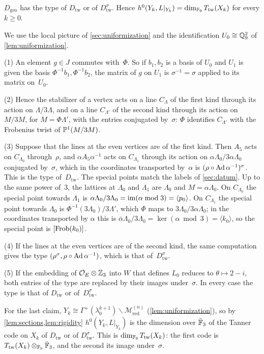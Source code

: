 \begin{lemma}\label{lem:twist}
\notformalized
$D_{\mathrm{geo}}$ has the type of $D_{\mathrm{tw}}$ or of $D_{\mathrm{tw}}^\sigma$. Hence
$h^0(Y_k,L|_{Y_k})=\dim_{\mathbb{F}_9}T_{\mathrm{tw}}(X_k)$ for every $k\ge0$.
\end{lemma}
\begin{informalproof}
We use the local picture of \cref{sec:uniformization} and the identification $U_0\cong\mathbb{Q}_9^2$ of
\cref{lem:uniformization}.

(1) An element $g\in J$ commutes with~$\Phi$. So if $b_1,b_2$ is a basis of $U_0$ and $U_1$ is given the basis
$\Phi^{-1}b_1,\Phi^{-1}b_2$, the matrix of $g$ on $U_1$ is $\sigma^{-1}=\sigma$ applied to its matrix on~$U_0$.

(2) Hence the stabilizer of a vertex acts on a line $C_\Lambda$ of the first kind through its action on $\Lambda/3\Lambda$,
and on a line $C_{\Lambda'}$ of the second kind through its action on $M/3M$, for $M=\Phi\Lambda'$, with the entries
conjugated by~$\sigma$: $\Phi$ identifies $C_{\Lambda'}$ with the Frobenius twist of $\mathbb{P}^1(M/3M)$.

(3) Suppose that the lines at the even vertices are of the first kind. Then $A_5$ acts on $C_{\Lambda_0}$ through~$\rho$, and
$\alpha A_5\alpha^{-1}$ acts on $C_{\Lambda_1}$ through its action on $\alpha\Lambda_0/3\alpha\Lambda_0$ conjugated by~$\sigma$,
which in the coordinates transported by~$\alpha$ is $(\rho\circ\operatorname{Ad}\alpha^{-1})^\sigma$. This is the type of~$D_{\mathrm{tw}}$.
The special points match the labels of \cref{sec:datum}. Up to the same power of~$3$, the lattices at $\Lambda_0$ and
$\Lambda_1$ are $\Lambda_0$ and $M=\alpha\Lambda_0$. On $C_{\Lambda_0}$ the special point towards $\Lambda_1$ is
$\alpha\Lambda_0/3\Lambda_0=\operatorname{im}(\alpha\bmod3)=\langle p_0\rangle$. On $C_{\Lambda_1}$ the special point towards $\Lambda_0$ is
$\Phi^{-1}(3\Lambda_0)/3\Lambda'$, which $\Phi$ maps to $3\Lambda_0/3\alpha\Lambda_0$; in the coordinates transported by
$\alpha$ this is $\bar\alpha\Lambda_0/3\Lambda_0=\ker(\alpha\bmod3)=\langle k_0\rangle$, so the special point is
$[\operatorname{Frob}(k_0)]$.

(4) If the lines at the even vertices are of the second kind, the same computation gives the type
$(\rho^\sigma,\rho\circ\operatorname{Ad}\alpha^{-1})$, which is that of~$D_{\mathrm{tw}}^\sigma$.

(5) If the embedding of $\mathcal{O}_E\otimes\mathbb{Z}_3$ into $W$ that defines $L_0$ reduces to $\theta\mapsto2-i$, both entries of the
type are replaced by their images under~$\sigma$. In every case the type is that of $D_{\mathrm{tw}}$ or
of~$D_{\mathrm{tw}}^\sigma$.

For the last claim, $Y_k\cong\Gamma^+(\lambda_0^{k+1})\backslash\mathcal M^{(n)}_{\mathrm{red}}$ (\cref{lem:uniformization}),
so by \cref{lem:sections,lem:rigidity} $h^0(Y_k,L|_{Y_k})$ is the dimension over $\bar{\mathbb{F}}_3$ of the Tanner code on $X_k$ of
$D_{\mathrm{tw}}$ or of $D_{\mathrm{tw}}^\sigma$. This is $\dim_{\mathbb{F}_9}T_{\mathrm{tw}}(X_k)$: the first code is
$T_{\mathrm{tw}}(X_k)\otimes_{\mathbb{F}_9}\bar{\mathbb{F}}_3$, and the second its image under~$\sigma$.
\end{informalproof}

